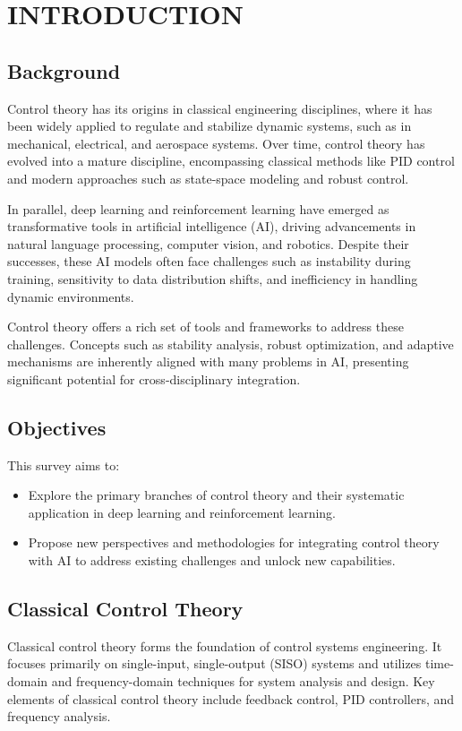 \documentclass{IEEEojcsys}
\begin{document}
\section{INTRODUCTION}
\subsection{Background}
Control theory has its origins in classical engineering disciplines, where it has been widely applied to regulate and stabilize dynamic systems, such as in mechanical, electrical, and aerospace systems. Over time, control theory has evolved into a mature discipline, encompassing classical methods like PID control and modern approaches such as state-space modeling and robust control.

In parallel, deep learning and reinforcement learning have emerged as transformative tools in artificial intelligence (AI), driving advancements in natural language processing, computer vision, and robotics. Despite their successes, these AI models often face challenges such as instability during training, sensitivity to data distribution shifts, and inefficiency in handling dynamic environments.

Control theory offers a rich set of tools and frameworks to address these challenges. Concepts such as stability analysis, robust optimization, and adaptive mechanisms are inherently aligned with many problems in AI, presenting significant potential for cross-disciplinary integration.

\subsection{Objectives}
This survey aims to:
\begin{itemize}
    \item Explore the primary branches of control theory and their systematic application in deep learning and reinforcement learning.
    \item Propose new perspectives and methodologies for integrating control theory with AI to address existing challenges and unlock new capabilities.
\end{itemize}

\subsection{Classical Control Theory}
Classical control theory forms the foundation of control systems engineering. It focuses primarily on single-input, single-output (SISO) systems and utilizes time-domain and frequency-domain techniques for system analysis and design. Key elements of classical control theory include feedback control, PID controllers, and frequency analysis.
\end{document}
